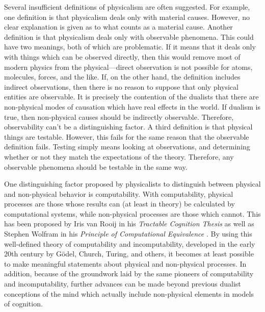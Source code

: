 Several insufficient definitions of physicalism are often suggested. For example, one definition is that physicalism deals only with material causes.  However, no clear explanation is given as to what counts as a material cause.  Another definition is that physicalism deals only with observable phenomena.  This could have two meanings, both of which are problematic.  If it means that it deals only with things which can be observed directly, then this would remove most of modern physics from the physical---direct observation is not possible for atoms, molecules, forces, and the like.  If, on the other hand, the definition includes indirect observations, then there is no reason to suppose that only physical entities are observable.  It is precisely the contention of the dualists that there are non-physical modes of causation which have real effects in the world.  If dualism is true, then non-physical causes should be indirectly observable.  Therefore, observability can't be a distinguishing factor.  A third definition is that physical things are testable.  However, this fails for the same reason that the observable definition fails.  Testing simply means looking at observations, and determining whether or not they match the expectations of the theory.  Therefore, any observable phenomena should be testable in the same way.

One distinguishing factor proposed by physicalists to distinguish between physical and non-physical behavior is computability.  With computability, physical processes are those whose results can (at least in theory) be calculated by computational systems, while non-physical processes are those which cannot.  This has been proposed by Iris van Rooij in his \textit{Tractable Cognition Thesis} as well as Stephen Wolfram in his \textit{Principle of Computational Equivalence} \citep{vanrooij2008, wolfram2002}.  By using this well-defined theory of computability and incomputability, developed in the early 20th century by G\"{o}del, Church, Turing, and others, it becomes at least possible to make meaningful statements about physical and non-physical processes.  In addition, because of the groundwork laid by the same pioneers of computability and incomputability, further advances can be made beyond
previous dualist conceptions of the mind which actually include non-physical elements in models of cognition.

